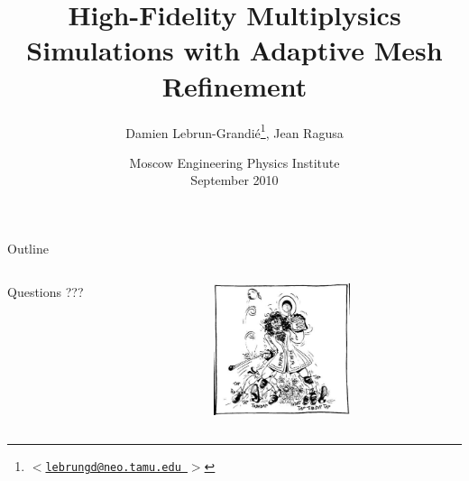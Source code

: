\documentclass[hyperref={pdfpagelabels=false}]{beamer}
\title[High-Fidelity Multiplysics Simulations]
{High-Fidelity Multiplysics Simulations with Adaptive Mesh Refinement}
\author[D. Lebrun-Grandi\'e] %
{Damien Lebrun-Grandi\'e\footnote{ \texttt{$<$\href{mailto:lebrungd@neo.tamu.edu}{lebrungd@neo.tamu.edu }$>$} }, Jean Ragusa}
\institute[Texas A\&M University] %
{Nuclear Engineering Department \\ Texas A\&M University}
\date[MEPhI, Sep 2010] %
{Moscow Engineering Physics Institute \\ September 2010}
\begin{document}
\begin{frame}
  \titlepage
\end{frame}




\begin{frame}{Outline}
   \tableofcontents
\end{frame}









\begin{frame}{}
  \Large
  \begin{columns}
  \begin{column}{7cm}
    \centering
    Questions ???
  \end{column}
  \begin{column}{5cm}
    \includegraphics[width=4cm]{figures/newton_danse_by_gotlib}
  \end{column}
  \end{columns}
\end{frame}


%  
%  
\end{document}
